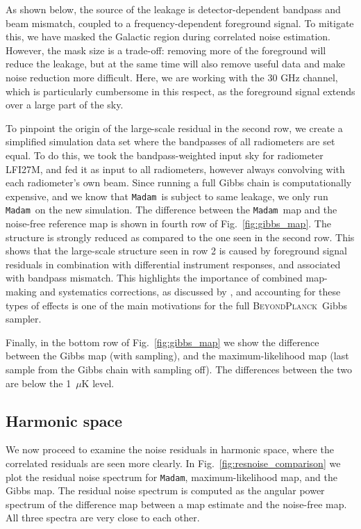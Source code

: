 \documentclass[twocolumn]{aa}
\newcommand{\BP}{\textsc{BeyondPlanck}}
\newcommand{\Madam}{\texttt{Madam}}
\begin{document}
As shown below, the source of the leakage is detector-dependent
bandpass and beam mismatch, coupled to a frequency-dependent
foreground signal.  To mitigate this, we have masked the Galactic region
during correlated noise estimation. However, the mask size is a
trade-off: removing more of the foreground will reduce the leakage,
but at the same time will also remove useful data and make noise reduction more
difficult. Here, we are working with the 30 GHz channel, which is
particularly cumbersome in this respect, as the foreground signal
extends over a large part of the sky.

To pinpoint the origin of the large-scale residual in the second row,
we create a simplified simulation data set where the bandpasses of all
radiometers are set equal.  To do this, we took the bandpass-weighted input
sky for radiometer LFI27M, and fed it as input to all radiometers,
however always convolving with each radiometer's own beam.
Since running a full Gibbs chain is
computationally expensive, and we know that \Madam\ is subject to same
leakage, we only run \Madam\ on the new simulation.  The difference
between the \Madam\ map and the noise-free reference map is shown in
fourth row of Fig.~\ref{fig:gibbs_map}.  The structure is strongly
reduced as compared to the one seen in the second row.  This shows
that the large-scale structure seen in row 2 is caused by foreground
signal residuals in combination with differential instrument
responses, and associated with bandpass mismatch.  This highlights the
importance of combined map-making and systematics corrections, as
discussed by \citet{bp01}, and accounting for these types of effects
is one of the main motivations for the full \BP\ Gibbs sampler.

Finally, in the bottom row of Fig.~\ref{fig:gibbs_map} we show the
difference between the Gibbs map (with sampling), and the
maximum-likelihood map (last sample from the Gibbs chain with sampling
off).  The differences between the two are below the 1~$\mu$K level.


\subsection{Harmonic space}
\label{sec:harmonicspace}


We now proceed to examine the noise residuals in harmonic space,
where the correlated residuals are seen more clearly.
In Fig.~\ref{fig:resnoise_comparison} we plot the residual noise spectrum
for \Madam, maximum-likelihood  map, and the Gibbs map.
The residual noise spectrum is computed as the angular power spectrum
of the difference map between a map estimate and the noise-free map.
All three spectra are very close to each other.
\end{document}
